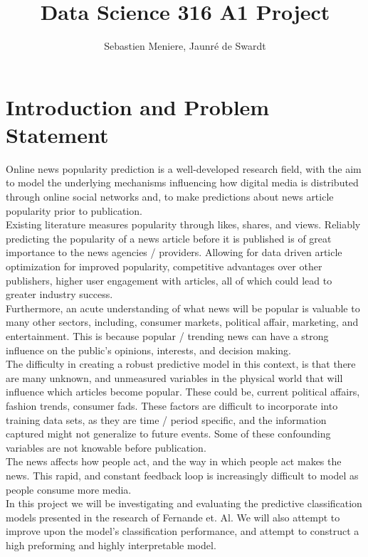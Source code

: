 \documentclass{article}
\title{Data Science 316 A1 Project}
\author{Sebastien Meniere, Jaunré de Swardt}
\begin{document}
\maketitle

\section{Introduction and Problem Statement}
Online news popularity prediction is a well-developed research field, with the aim to model the underlying mechanisms influencing how digital media is distributed through online social networks and, to make predictions about news article popularity prior to publication. \\

Existing literature measures popularity through likes, shares, and views. Reliably predicting the popularity of a news article before it is published is of great importance to the news agencies / providers. Allowing for data driven article optimization for improved popularity, competitive advantages over other publishers, higher user engagement with articles, all of which could lead to greater industry success. \\

Furthermore, an acute understanding of what news will be popular is valuable to many other sectors, including, consumer markets, political affair, marketing, and entertainment. This is because popular / trending news can have a strong influence on the public’s opinions, interests, and decision making. \\

The difficulty in creating a robust predictive model in this context, is that there are many unknown, and unmeasured variables in the physical world that will influence which articles become popular. These could be, current political affairs, fashion trends, consumer fads. These factors are difficult to incorporate into training data sets, as they are time / period specific, and the information captured might not generalize to future events. Some of these confounding variables are not knowable before publication. \\

The news affects how people act, and the way in which people act makes the news. This rapid, and constant feedback loop is increasingly difficult to model as people consume more media. \\

In this project we will be investigating and evaluating the predictive classification models presented in the research of Fernande et. Al. We will also attempt to improve upon the model’s classification performance, and attempt to construct a high preforming and highly interpretable model.
\end{document}
